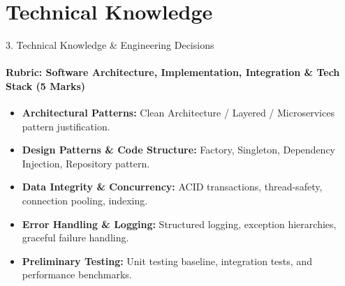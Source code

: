 \documentclass[aspectratio=169, 11pt]{beamer}
\begin{document}
\section{Technical Knowledge}
\begin{frame}{3. Technical Knowledge \& Engineering Decisions}
    \framesubtitle{Rubric: Software Architecture, Implementation, Integration \& Tech Stack (5 Marks)}
    \begin{itemize}
        \item \textbf{Architectural Patterns:} Clean Architecture / Layered / Microservices pattern justification.
        \item \textbf{Design Patterns \& Code Structure:} Factory, Singleton, Dependency Injection, Repository pattern.
        \item \textbf{Data Integrity \& Concurrency:} ACID transactions, thread-safety, connection pooling, indexing.
        \item \textbf{Error Handling \& Logging:} Structured logging, exception hierarchies, graceful failure handling.
        \item \textbf{Preliminary Testing:} Unit testing baseline, integration tests, and performance benchmarks.
    \end{itemize}
\end{frame}

\end{document}
